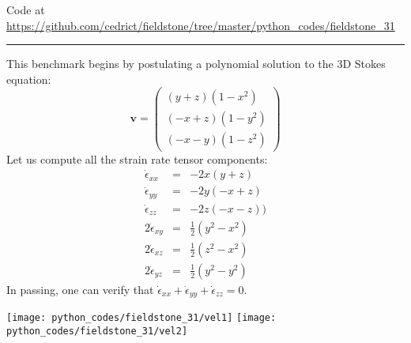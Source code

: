 

\begin{center}
Code at \url{https://github.com/cedrict/fieldstone/tree/master/python_codes/fieldstone_31}
\end{center}

\par\noindent\rule{\textwidth}{0.4pt}


This benchmark begins by postulating a polynomial solution to the 3D Stokes equation:
\begin{equation}
{\bm v}
=
\left(
\begin{array}{c}
(y+z)(1-x^2) \\
(-x+z)(1-y^2) \\
(-x-y)(1-z^2) 
\end{array}
\right)
\label{eqgarf}
\end{equation}
Let us compute all the strain rate tensor components:
\begin{eqnarray}
\dot{\epsilon}_{xx}&=& -2x(y+z)  \nonumber\\
\dot{\epsilon}_{yy}&=& -2y(-x+z) \nonumber\\
\dot{\epsilon}_{zz}&=& -2z(-x-z)) \nonumber\\
2 \dot{\epsilon}_{xy}&=& \frac{1}{2}(y^2-x^2) \nonumber\\ 
2 \dot{\epsilon}_{xz}&=& \frac{1}{2}(z^2-x^2)  \nonumber\\
2 \dot{\epsilon}_{yz}&=& \frac{1}{2}(y^2-y^2)  \nonumber
\end{eqnarray}
In passing, one can verify that 
$
\dot{\epsilon}_{xx}
+\dot{\epsilon}_{yy}
+\dot{\epsilon}_{zz}=0
$.

\texttt{[image: python\_codes/fieldstone\_31/vel1]}
\texttt{[image: python\_codes/fieldstone\_31/vel2]}





